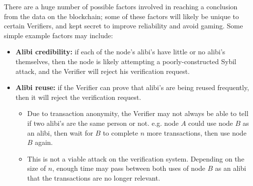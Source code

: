 There are a huge number of possible factors involved in reaching a conclusion from the data on the blockchain; some of these factors will likely be unique to certain Verifiers, and kept secret to improve reliability and avoid gaming. Some simple example factors may include:
\begin{itemize}
	\item \textbf{Alibi credibility:} if each of the node’s alibi’s have little or no alibi’s themselves, then the node is likely attempting a poorly-constructed Sybil attack, and the Verifier will reject his verification request.
	\item \textbf{Alibi reuse:} if the Verifier can prove that alibi’s are being reused frequently, then it will reject the verification request.
	\begin{itemize}
		\item Due to transaction anonymity, the Verifier may not always be able to tell if two alibi's are the same person or not. e.g. node $A$ could use node $B$ as an alibi, then wait for $B$ to complete $n$ more transactions, then use node $B$ again.
		\item This is not a viable attack on the verification system. Depending on the size of $n$, enough time may pass between both uses of node $B$ as an alibi that the transactions are no longer relevant.
	\end{itemize}
\end{itemize}